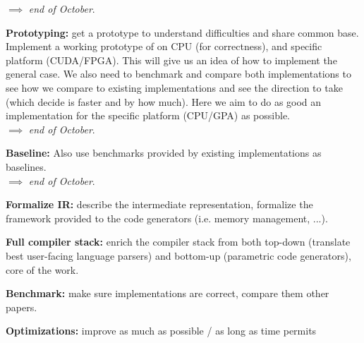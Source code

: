 \documentclass[11pt]{article}
\begin{document}
$\implies$ \emph{end of October}.

\item \textbf{Prototyping:} get a prototype to understand difficulties and share common base. \\ Implement a working prototype of  on CPU (for correctness), and specific platform (CUDA/FPGA). This will give us an idea of how to implement the general case. We also need to benchmark and compare both implementations to see how we compare to existing implementations and see the direction to take (which decide is faster and by how much). Here we aim to do as good an implementation for the specific platform (CPU/GPA) as possible.\\
$\implies$ \emph{end of October}.

\item \textbf{Baseline:} Also use benchmarks provided by existing implementations as baselines.\\
$\implies$ \emph{end of October}.

\item \textbf{Formalize IR:} describe the intermediate representation, formalize the framework provided to the code generators (i.e. memory management, ...).
\item \textbf{Full compiler stack:} enrich the compiler stack from both top-down (translate best user-facing language parsers) and bottom-up (parametric code generators), core of the work.
\item \textbf{Benchmark:} make sure implementations are correct, compare them other papers.
\item \textbf{Optimizations:} improve as much as possible / as long as time permits
\ole
\end{document}
